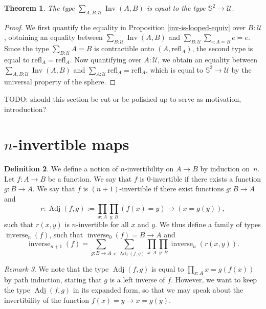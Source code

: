 \documentclass{article}
\theoremstyle{plain}
\newtheorem{theorem}{Theorem}
\theoremstyle{definition}
\newtheorem{definition}[theorem]{Definition}
\theoremstyle{remark}
\newtheorem{remark}[theorem]{Remark}
\newcommand{\refl}{\mathrm{refl}}
\newcommand{\nsphere}[1]{\mathbb{S}^{#1}}
\newcommand{\sphere}{\nsphere{2}}
\newcommand{\U}{\mathcal{U}}
\DeclareMathOperator{\inv}{Inv}
\DeclareMathOperator{\inverse}{inverse}
\DeclareMathOperator{\adj}{Adj}
\newcommand{\ninverse}[1]{\inverse_{#1}}
\begin{document}
\begin{theorem}
  The type \(\sum_{A, B : \U}\inv(A, B)\) is equal to the type \(\sphere \to \U\).
\end{theorem}

\begin{proof}
  We first quantify the equality in Proposition
  \ref{inv-is-looped-equiv} over \(B : \U\), obtaining an equality between
  \(\sum_{B : \U}\inv(A, B)\) and \(\sum_{B : \U}\sum_{e : A = B}e = e\).
  Since the type \(\sum_{B : \U}A = B\) is contractible onto
  \(\left(A, \refl_{A}\right)\), the second type is equal to
  \(\refl_{A} = \refl_{A}\). Now quantifying
  over \(A : \U\), we obtain an equality between \(\sum_{A, B : \U}\inv(A, B)\) and
  \(\sum_{A : \U}\refl_{A} = \refl_{A}\), which is equal to \(\sphere \to \U\) by the
  universal property of the sphere.
\end{proof}

TODO: should this section be cut or be polished up to serve as motivation, introduction?

\section{\(n\)-invertible maps}

\begin{definition}
  We define a notion of \(n\)-invertibility on \(A \to B\) by induction on~\(n\).
  Let \(f : A \to B\) be a function. We say that \(f\) is
  \(0\)-invertible if there exists a function \(g : B \to A\).
  We say that \(f\) is \((n + 1)\)-invertible if there exist functions \(g : B \to A\) and
  \[r : \adj(f, g) := \prod_{x : A}\prod_{y : B}(f(x) = y) \to (x = g(y)),\] such that
  \(r(x, y)\) is \(n\)-invertible for all \(x\) and \(y\). We thus define a family of types
  \(\ninverse{n}(f)\), such that
  \(\ninverse{0}(f) = B \to A\) and
  \[\ninverse{n + 1}(f) = \sum_{g : B \to A}\sum_{r : \adj(f, g)}
    \prod_{x : A}\prod_{y : B}\ninverse{n}(r(x, y)).\]
\end{definition}

\begin{remark}
  We note that the type \(\adj(f, g)\) is equal to \(\prod_{x : A}x = g(f(x))\) by path
  induction, stating that \(g\) is a left inverse of \(f\). However, we want to keep the
  type \(\adj(f, g)\) in its expanded form, so that we may speak about the invertibility
  of the function \(f(x) = y \to x = g(y)\).
\end{remark}
\end{document}
